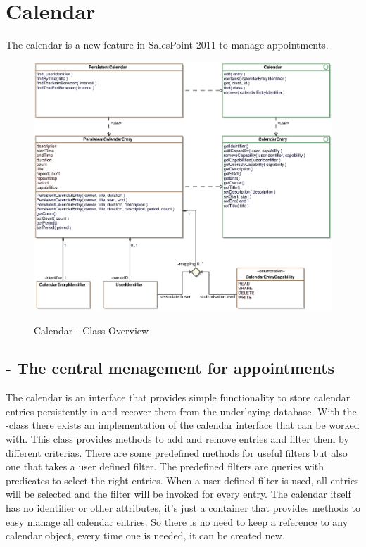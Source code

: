 \newpage
\section{Calendar}

The calendar is a new feature in SalesPoint 2011 to manage appointments. 

\begin{figure}[ht]
	\centering
  \includegraphics[width=1.0\textwidth]{images/Calendar_Overview.eps}
	\label{calendar_overview}
	\caption{Calendar - Class Overview}
\end{figure}

\subsection{ - The central menagement for appointments}
The calendar is an interface that provides simple functionality to store calendar entries persistently in and recover them from the underlaying database.
With the -class there exists an implementation of the calendar interface that can be worked with. This class provides methods
to add and remove entries and filter them by different criterias.
There are some predefined methods for useful filters but also one that takes a user defined filter. The predefined filters are queries with predicates to select the right entries. When a user defined filter is used, all entries will be selected and the filter will be invoked for every entry.  
The  calendar itself has no identifier or other attributes, it's just a container that provides methods to easy manage all calendar entries.
So there is no need to keep a reference to any calendar object, every time one is needed, it can be created new.


